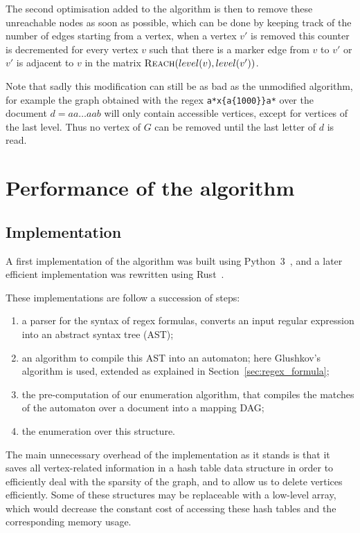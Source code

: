 \documentclass[11px]{article}
\theoremstyle{definition}
\begin{document}
        The second optimisation added to the algorithm is then to remove these
        unreachable nodes as soon as possible, which can be done by keeping
        track of the number of edges starting from a vertex, when a vertex $v'$
        is removed this counter is decremented for every vertex $v$ such that
        there is a marker edge from $v$ to $v'$ or $v'$ is adjacent to $v$ in
        the matrix $\Call{Reach}{level(v), level(v')}$.

        Note that sadly this modification can still be as bad as the unmodified
        algorithm, for example the graph obtained with the regex
        \texttt{a*x\{a\{1000\}\}a*} over the document $d = aa \ldots aab$ will
        only contain accessible vertices, except for vertices of the last
        level. Thus no vertex of $G$ can be removed until the last letter of
        $d$ is read.

  \section{Performance of the algorithm}

    \subsection{Implementation}

      A first implementation of the algorithm was built using
      Python~3~\cite{implPython}, and a later efficient implementation was
      rewritten using Rust~\cite{implRust}.

      These implementations are follow a succession of steps:
      \begin{enumerate}
        \item a parser for the syntax of regex formulas, converts an input
          regular expression into an abstract syntax tree (AST);
        \item an algorithm to compile this AST into an automaton; here
          Glushkov's algorithm is used, extended as explained in
          Section~\ref{sec:regex_formula};
        \item the pre-computation of our enumeration algorithm, that compiles
          the matches of the automaton over a document into a mapping DAG;
        \item the enumeration over this structure.
      \end{enumerate}

      The main unnecessary overhead of the implementation as it stands is that
      it saves all vertex-related information in a hash table data structure in
      order to efficiently deal with the sparsity of the graph, and to allow us
      to delete vertices efficiently. Some of these structures may be
      replaceable with a low-level array, which would decrease the constant
      cost of accessing these hash tables and the corresponding memory usage.
\end{document}
